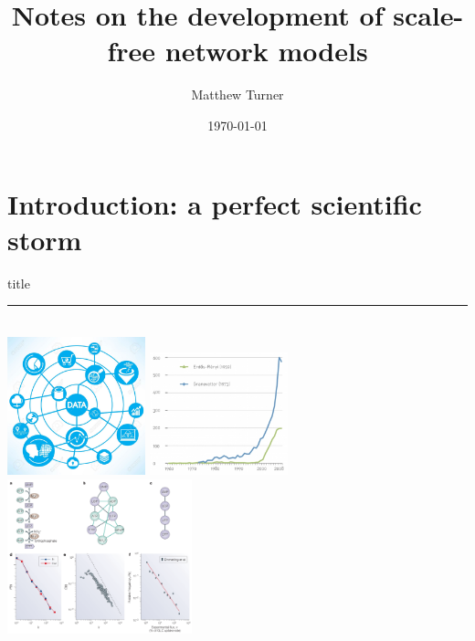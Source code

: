 \documentclass{beamer}
\title{Notes on the development of scale-free network models}
\author{Matthew Turner}
\institute{UC Merced, Kello lab meeting}
\date{\today}
\begin{document}
{ 
\frame{\titlepage}}



\section{Introduction: a perfect scientific storm}
\begin{frame}[plain]
  \vfill
  \centering
  \begin{beamercolorbox}[sep=8pt,center,shadow=true,rounded=true]{title}
    \insertsectionhead\par%
    \color{oxfordblue}\noindent\rule{10cm}{1pt} \\[1em]
    \includegraphics[width=0.3\textwidth]{Figures/internet-data.jpg}
    \includegraphics[width=0.3\textwidth]{Figures/ErdosRenyi-GranovetterCitations.png}
    \includegraphics[width=0.4\textwidth]{Figures/NetworkCellBiologyIntro.png}
  \end{beamercolorbox}
  \vfill
\end{frame}
\end{document}

